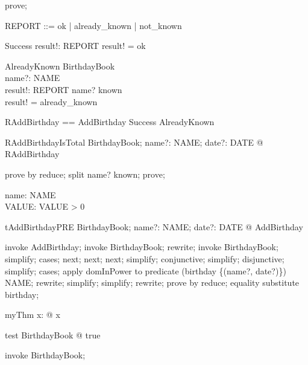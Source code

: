 \begin{zproof}
prove;
\end{zproof}

\begin{zed}
REPORT ::= ok | already\_known | not\_known
\end{zed}

\begin{schema}{Success}
  result!: REPORT
\where
  result! = ok
\end{schema}

\begin{schema}{AlreadyKnown}
  \Xi BirthdayBook\\
  name?: NAME\\
  result!: REPORT
\where
  name? \in  known\\
  result! = already\_known
\end{schema}

\begin{zed}
RAddBirthday == AddBirthday \land  Success \lor  AlreadyKnown
\end{zed}

\begin{theorem}{RAddBirthdayIsTotal}
\forall  BirthdayBook; name?: NAME; date?: DATE @ \pre  RAddBirthday
\end{theorem}

\begin{zproof}[RAddBirthdayIsTotal]
prove by reduce;
split name? \in  known;
prove;
\end{zproof}

\begin{axdef}
  name: NAME\\
  VALUE: \nat
\where
  VALUE > 0
\end{axdef}

\begin{theorem}{tAddBirthdayPRE}
\forall  BirthdayBook; name?: NAME; date?: DATE @ \pre  AddBirthday
\end{theorem}

\begin{zproof}[tAddBirthdayPRE]
invoke AddBirthday;
invoke \Delta BirthdayBook;
rewrite;
invoke BirthdayBook;
simplify;
cases;
next;
next;
next;
simplify;
conjunctive;
simplify;
disjunctive;
simplify;
cases;
apply domInPower to predicate \dom  (birthday \cup  \{(name?, date?)\}) \in  \power  NAME;
rewrite;
simplify;
simplify;
rewrite;
prove by reduce;
equality substitute \dom  birthday;
\end{zproof}

\begin{theorem}{myThm}
\forall  x: \nat  @ x 
\end{theorem}

\begin{theorem}{test}
\forall BirthdayBook @ true
\end{theorem}

\begin{zproof}[test]
invoke BirthdayBook;
\end{zproof}


